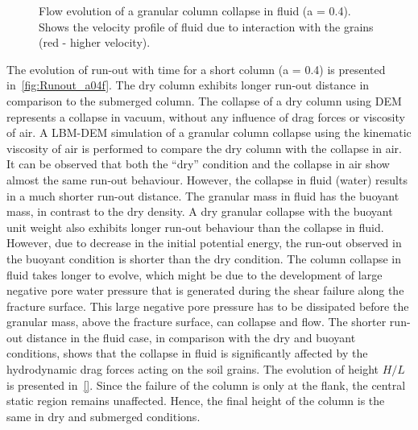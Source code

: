\begin{figure}
\caption{Flow evolution of a granular column collapse in fluid (a = 0.4). Shows 
the velocity profile of fluid due to interaction with the grains (red - higher 
velocity).}
\label{fig:a04_snapshots}
\end{figure}


The evolution of run-out with time for a short column (a = 0.4) is presented 
in~\cref{fig:Runout_a04f}. The dry column exhibits longer run-out distance in 
comparison to the submerged column. The collapse of a dry column using DEM 
represents a collapse in vacuum, without any influence of drag forces or 
viscosity of air. A LBM-DEM simulation of a granular column collapse using the 
kinematic viscosity of air is performed to compare the dry column with the 
collapse in air. It can be observed that both the ``dry'' condition and the 
collapse in air show almost the same run-out behaviour. However, the collapse 
in fluid (water) results in a much shorter run-out distance. The granular mass 
in fluid has the buoyant mass, in contrast to the dry density. A dry granular 
collapse with the buoyant unit weight also 
exhibits longer run-out behaviour than the collapse in fluid. However, due to 
decrease in the initial potential energy, the run-out observed in the buoyant 
condition is shorter than the dry condition. The column collapse in fluid takes 
longer to evolve, which might be due to the development 
of large negative pore water pressure that is generated during the shear 
failure along the fracture surface. This large negative pore pressure has to be 
dissipated before the granular mass, above the fracture surface, can collapse 
and flow. The shorter run-out distance in the fluid case, in comparison with 
the dry and buoyant conditions, shows that the collapse in fluid is 
significantly affected by the hydrodynamic drag forces acting on the soil 
grains. The evolution of height $H/L$ is presented in~\cref{}. Since the 
failure of the 
column is only at the flank, the central static region remains unaffected. 
Hence, the final height of the column is the same in dry and submerged 
conditions.

